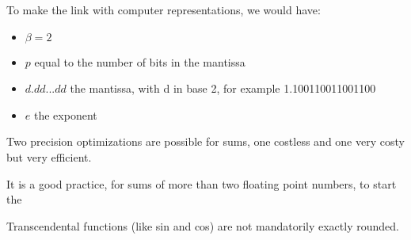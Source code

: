 To make the link with computer representations, we would have:
\begin{itemize}
\item $\beta=2$
\item $p$ equal to the number of bits in the mantissa
\item $d.dd...dd$ the mantissa, with d in base 2, for example 1.100110011001100
\item $e$ the exponent
\end{itemize}




Two precision optimizations are possible for sums, one costless and one very costy but very efficient.


It is a good practice, for sums of more than two floating point numbers, to start the 



Transcendental functions (like sin and cos) are not mandatorily exactly rounded.






